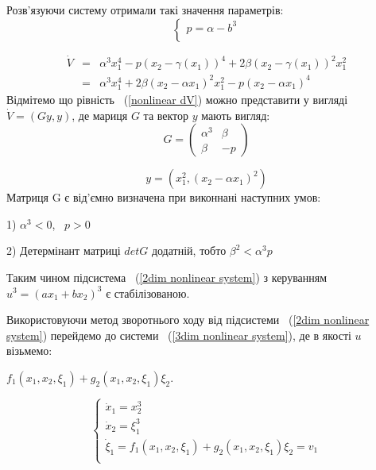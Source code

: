 \documentclass{article}
\begin{document}
Розв'язуючи  систему отримали такі значення параметрів: 
\begin{equation}
    \begin{cases}
        p = \alpha - b^3\\
    \end{cases}
\end{equation}

\begin{eqnarray}\label{nonlinear dV}
    \dot V &=& \alpha^3x_{1}^4 - p(x_2-\gamma(x_1))^4
    +2\beta(x_2-\gamma(x_1))^2x_{1}^2\nonumber\\ 
    &=&\alpha^3x_{1}^4 + 2\beta(x_2-\alpha x_1)^2x_{1}^2
    -p(x_2-\alpha x_1)^4
\end{eqnarray}
Відмітемо що рівність ~(\ref{nonlinear dV}) можно представити у вигляді $\dot V =(Gy,y)$, де 
мариця $G$ та вектор $y$ мають вигляд: 
\begin{equation}
G=\left(\begin{array}{clr}
    \alpha^3 & \beta\\
    \beta & -p
\end{array}\right) 
\end{equation}

\begin{equation}
    y=(x_{1}^2,(x_2-\alpha x_{1})^2)
\end{equation}
Матриця G є від'ємно визначена при виконнані наступних умов:

1) $\alpha^3 < 0$, ~$p > 0$

2) Детермінант матриці $det G$ додатній, тобто $\beta^2<\alpha^3p$ 

Таким чином підсистема ~(\ref{2dim nonlinear system}) з керуванням  $u^3=(ax_1+bx_2)^3$ 
є стабілізованою.
\pagebreak

Використовуючи метод зворотнього ходу від підсистеми ~(\ref{2dim nonlinear system}) 
перейдемо до системи   ~(\ref{3dim nonlinear system}), де  в якості $u$ візьмемо:

$f_1(x_1,x_2,\xi_1)+g_2(x_1,x_2,\xi_1)\xi_2$.

\begin{equation} \label{3dim nonlinear system step2}
    \begin{cases}
        \dot x_1 = x_2^3 \\
        \dot x_2 = \xi_1^3\\
        \dot \xi_1 =f_1(x_1,x_2,\xi_1)+g_2(x_1,x_2,\xi_1)\xi_2 = v_1\\
        \end{cases}
\end{equation}
\end{document}
